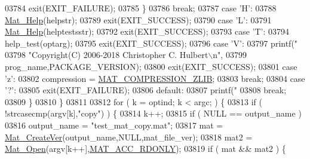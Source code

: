 \begin{DoxyCode}
{{{{{{{{{{{{{{{{{{{{{{{{{{{{{{{{{{{{{{{{{{{{{{{{{{{{{{{{{{{{{{{{{{03784                     exit(EXIT\_FAILURE);
03785                 \}
03786                 \textcolor{keywordflow}{break};
03787             \textcolor{keywordflow}{case} \textcolor{charliteral}{'H'}:
03788                 \hyperlink{group__mat__util_gaa4039c185e807ed2e9682b66fe2ea331}{Mat\_Help}(helpstr);
03789                 exit(EXIT\_SUCCESS);
03790             \textcolor{keywordflow}{case} \textcolor{charliteral}{'L'}:
03791                 \hyperlink{group__mat__util_gaa4039c185e807ed2e9682b66fe2ea331}{Mat\_Help}(helptestsstr);
03792                 exit(EXIT\_SUCCESS);
03793             \textcolor{keywordflow}{case} \textcolor{charliteral}{'T'}:
03794                 help\_test(optarg);
03795                 exit(EXIT\_SUCCESS);
03796             \textcolor{keywordflow}{case} \textcolor{charliteral}{'V'}:
03797                 printf(\textcolor{stringliteral}{"%
03798                        \textcolor{stringliteral}{"Copyright(C) 2006-2018 Christopher C. Hulbert\(\backslash\)n"},
03799                        prog\_name,PACKAGE\_VERSION);
03800                 exit(EXIT\_SUCCESS);
03801             \textcolor{keywordflow}{case} \textcolor{charliteral}{'z'}:
03802                 compression = \hyperlink{group___m_a_t_gga768c318af97bd2567758ecb001ceb7f4a5181d2f71eab0f12f05ba65d4f13fb53}{MAT\_COMPRESSION\_ZLIB};
03803                 \textcolor{keywordflow}{break};
03804             \textcolor{keywordflow}{case} \textcolor{charliteral}{'?'}:
03805                 exit(EXIT\_FAILURE);
03806             \textcolor{keywordflow}{default}:
03807                 printf(\textcolor{stringliteral}{"%
03808                 \textcolor{keywordflow}{break};
03809         \}
03810     \}
03811 
03812     \textcolor{keywordflow}{for} ( k = optind; k < argc; ) \{
03813         \textcolor{keywordflow}{if} ( !strcasecmp(argv[k],\textcolor{stringliteral}{"copy"}) ) \{
03814             k++;
03815             \textcolor{keywordflow}{if} ( NULL == output\_name )
03816                 output\_name = \textcolor{stringliteral}{"test\_mat\_copy.mat"};
03817             mat = \hyperlink{group___m_a_t_ga22d404f203af7869c841400e7ad247cf}{Mat\_CreateVer}(output\_name,NULL,mat\_file\_ver);
03818             mat2 = \hyperlink{group___m_a_t_gafbfedb5636a99f0ef867520c47f77d18}{Mat\_Open}(argv[k++],\hyperlink{group___m_a_t_ggaa9dcbc70f538af79bd557593ff6b5cdba8dd1457651b27ba9bea6cfba158c037c}{MAT\_ACC\_RDONLY});
03819             \textcolor{keywordflow}{if} ( mat && mat2 ) \{
}}}}}}}}}}}}}}}}}}}}}}}}}}}}}}}}}}}}}}}}}}}}}}}}}}}}}}}}}}}}}}}}}}}}
\end{DoxyCode}

